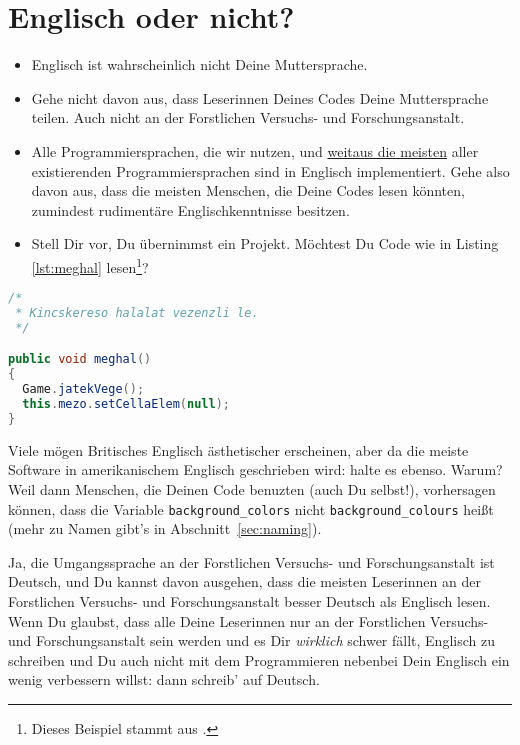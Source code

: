 \documentclass[twoside]{scrreprt}
\providecommand{\code}[1]{\texttt{#1}}
\providecommand{\FVA}[1]{Forstliche#1 Versuchs- und Forschungsanstalt}
\begin{document}
\section{Englisch oder nicht?}
\begin{itemize}
\item Englisch ist wahrscheinlich nicht Deine Muttersprache.
\end{itemize}
\begin{itemize}
\item Gehe nicht davon aus, dass Leserinnen Deines Codes Deine
    Muttersprache teilen. Auch nicht an der \FVA{n}.
\item Alle Programmiersprachen, die wir nutzen, und
  \href{http://en.wikipedia.org/wiki/Non-English-based_programming_languages}
  {weitaus die meisten}
  aller existierenden Programmiersprachen sind in Englisch implementiert.
  Gehe also davon aus, dass die meisten Menschen, die Deine Codes lesen
  k\"o{}nnten, zumindest rudiment\"a{}re Englischkenntnisse besitzen.
\item Stell Dir vor, Du \"u{}bernimmst ein Projekt. M\"o{}chtest Du Code wie
    in Listing \ref{lst:meghal}
    lesen\footnote{Dieses Beispiel stammt aus \cite{wsp}.}?
\end{itemize}
\begin{lstlisting}[float=h, label=lst:meghal, language=Java]
/*
 * Kincskereso halalat vezenzli le.
 */

public void meghal()
{
  Game.jatekVege();
  this.mezo.setCellaElem(null);
}
\end{lstlisting}

 Viele m\"o{}gen Britisches Englisch \"a{}sthetischer
erscheinen, aber da die meiste Software in amerikanischem Englisch geschrieben
wird: halte es ebenso. Warum? Weil dann Menschen, die Deinen Code benuzten
(auch Du selbst!), vorhersagen k\"o{}nnen, dass die Variable
\code{background\_colors} nicht \code{background\_colours} hei\ss{}t (mehr zu
Namen gibt's in Abschnitt~\ref{sec:naming}).

 Ja, die Umgangssprache an der \FVA{n} ist Deutsch, und Du
kannst davon ausgehen, dass die meisten Leserinnen an der \FVA{n} besser Deutsch
als Englisch lesen. Wenn Du glaubst, dass alle Deine Leserinnen nur an der
\FVA{n} sein werden und es Dir \emph{wirklich} schwer f\"a{}llt, Englisch zu
schreiben und Du auch nicht mit dem Programmieren nebenbei Dein Englisch ein
wenig verbessern willst: dann schreib' auf Deutsch.
\end{document}
